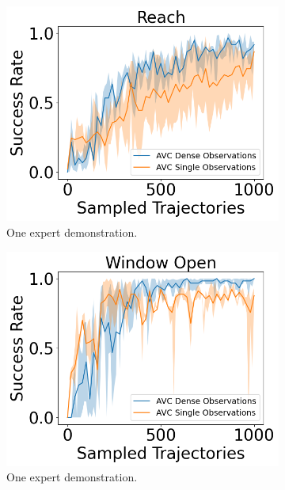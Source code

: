 \begin{figure}[htbp]
  \centering
  \begin{subfigure}[t]{0.32\textwidth}
    \includegraphics[width=\textwidth]{images/dense_vs_sparse_1/Reach.png}
    \caption{One expert demonstration.}
  \end{subfigure}
  \hfill
  \begin{subfigure}[t]{0.32\textwidth}
    \includegraphics[width=\textwidth]{images/dense_vs_sparse_1/Window Open.png}
    \caption{One expert demonstration.}
  \end{subfigure}
  \hfill
  \begin{subfigure}[t]{0.32\textwidth}

\end{subfigure}
\end{figure}
